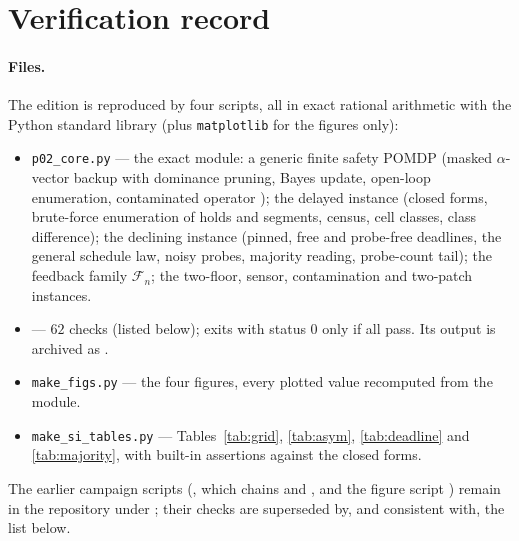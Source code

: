 \section{Verification record}\label{si:verification}

\paragraph{Files.} The edition is reproduced by four scripts, all in exact rational arithmetic with the Python standard library (plus \texttt{matplotlib} for the figures only):
\begin{itemize}[leftmargin=1.6em,itemsep=1pt]
\item \texttt{p02\_core.py} --- the exact module: a generic finite safety POMDP (masked $\alpha$-vector backup  with dominance pruning, Bayes update, open-loop enumeration, contaminated operator ); the delayed instance (closed forms, brute-force enumeration of holds and segments, census, cell classes, class difference); the declining instance (pinned, free and probe-free deadlines, the general schedule law, noisy probes, majority reading, probe-count tail); the feedback family $\mathcal F_n$; the two-floor, sensor, contamination and two-patch instances.
\item {} --- $62$ checks (listed below); exits with status $0$ only if all pass. Its output is archived as .
\item \texttt{make\_figs.py} --- the four figures, every plotted value recomputed from the module.
\item \texttt{make\_si\_tables.py} --- Tables~\ref{tab:grid}, \ref{tab:asym}, \ref{tab:deadline} and \ref{tab:majority}, with built-in assertions against the closed forms.
\end{itemize}
The earlier campaign scripts (, which chains  and , and the figure script ) remain in the repository under ; their checks are superseded by, and consistent with, the list below.

